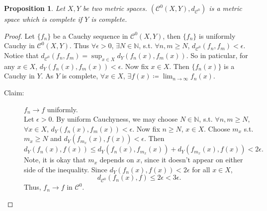 \documentclass[12pt]{article}
\theoremstyle{plain}
\newtheorem*{prop}{Proposition}
\theoremstyle{definition}
\begin{document}
\begin{prop}
    Let $X,Y$ be two metric spaces. 
    $(\mathcal{C}^0(X,Y),d_{\mathcal{C}^0})$ is a metric space which is complete
    if $Y$ is complete.
\end{prop}
\begin{proof}
    Let $\{f_n\}$ be a Cauchy sequence in $\mathcal{C}^0(X,Y)$, then $\{f_n\}$
    is uniformly Cauchy in $\mathcal{C}^0(X,Y)$.
    Thus $\forall \epsilon>0$, $\exists N\in\mathbb{N}$, s.t. $\forall n,m\geq
    N$, $d_{\mathcal{C}^0}(f_n,f_m)<\epsilon$.
    Notice that 
    $d_{\mathcal{C}^0}(f_n,f_m)=\sup_{x\in X}d_Y(f_n(x),f_m(x))$.
    So in paticular, for any $x\in X$, $d_Y(f_n(x),f_m(x))<\epsilon$.
    Now fix $x\in X$.
    Then $\{f_n(x)\}$ is a Cauchy in $Y$.
    As $Y$ is complete, $\forall x\in X$, $\exists
    f(x)\coloneqq\lim_{n\rightarrow\infty}f_n(x)$.
    \begin{description}
        \item[Claim:]
            $f_n\rightarrow f$ uniformly.\\
            Let $\epsilon>0$.
            By uniform Cauchyness, we may choose $N\in\mathbb{N}$, s.t.
            $\forall n,m\geq N$, $\forall x\in X$,
            $d_Y(f_n(x),f_m(x))<\epsilon$.
            Now fix $n\geq N$, $x\in X$.
            Choose $m_x$ s.t. $m_x\geq N$ and $d_Y(f_{m_x}(x),f(x))<\epsilon$.
            Then
            $$d_Y(f_n(x),f(x))\leq
            d_Y(f_n(x),f_{m_x}(x))+d_Y(f_{m_x}(x),f(x))<2\epsilon.$$
            Note, it is okay that $m_x$ depends on $x$, since it doesn't appear
            on either side of the inequality.
            Since $d_Y(f_n(x),f(x))<2\epsilon$ for all $x\in X$,
            $$d_{\mathcal{C}^0}(f_n(x),f)\leq 2\epsilon<3\epsilon.$$
            Thus, $f_n\rightarrow f$ in $\mathcal{C}^0$.
    \end{description}
\end{proof}
\end{document}
